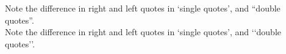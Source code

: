 \documentclass{article}
\begin{document}
\noindent Note the difference in right and left quotes in `single quotes', and ``double quotes''.\\
\noindent Note the difference in right and left quotes in \lq single quotes\rq, and \lq\lq double quotes\rq\rq.
\end{document}
